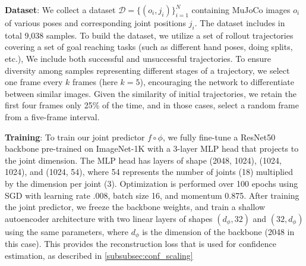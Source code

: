 \textbf{Dataset}: We collect a dataset $\mathcal{D}=\{(o_i, j_i)\}_{i=1}^N$ containing MuJoCo images $o_i$ of various poses and corresponding joint positions $j_i$. The dataset includes in total 9{,}038 samples. To build the dataset, we utilize a set of rollout trajectories covering a set of goal reaching tasks (such as different hand poses, doing splits, etc.), We include both successful and unsuccessful trajectories.
To ensure diversity among samples representing different stages of a trajectory, we select one frame every $k$ frames (here $k = 5$), encouraging the network to differentiate between similar images.
Given the similarity of initial trajectories, we retain the first four frames only 25\% of the time, and in those cases, select a random frame from a five-frame interval.

\textbf{Training}: To train our joint predictor $f \circ \phi$, we fully fine-tune a ResNet50 backbone \cite{he2015deepresiduallearningimage} pre-trained on ImageNet-1K \cite{deng2009imagenet} with a 3-layer MLP head that projects to the joint dimension. 
The MLP head has layers of shape (2048, 1024), (1024, 1024), and (1024, 54), where 54 represents the number of joints (18) multiplied by the dimension per joint (3). Optimization is performed over 100 epochs using SGD with learning rate .008, batch size 16, and momentum 0.875. After training the joint predictor, we freeze the backbone weights, and train a shallow autoencoder architecture with two linear layers of shapes $(d_\phi, 32)$ and $(32, d_\phi)$ using the same parameters, where $d_\phi$ is the dimension of the backbone (2048 in this case). This provides the reconstruction loss that is used for confidence estimation, as described in \ref{subsubsec:conf_scaling}




